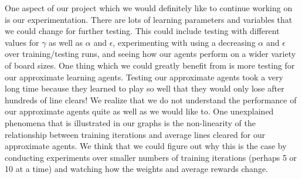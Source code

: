\documentclass[11pt]{article}
\begin{document}
\bigskip

One aspect of our project which we would definitely like to continue working on is our experimentation. There are lots of learning parameters and variables that we could change for further testing. This could include testing with different values for $\gamma$ as well as $\alpha$ and $\epsilon$, experimenting with using a decreasing $\alpha$ and $\epsilon$ over training/testing runs, and seeing how our agents perform on a wider variety of board sizes. One thing which we could greatly benefit from is more testing for our approximate learning agents. Testing our approximate agents took a very long time because they learned to play so well that they would only lose after hundreds of line clears! We realize that we do not understand the performance of our approximate agents quite as well as we would like to. One unexplained phenomena that is illustrated in our graphs is the non-linearity of the relationship between training iterations and average lines cleared for our approximate agents. We think that we could figure out why this is the case by conducting experiments over smaller numbers of training iterations (perhaps 5 or 10 at a time) and watching how the weights and average rewards change.

\bigskip
\end{document}
